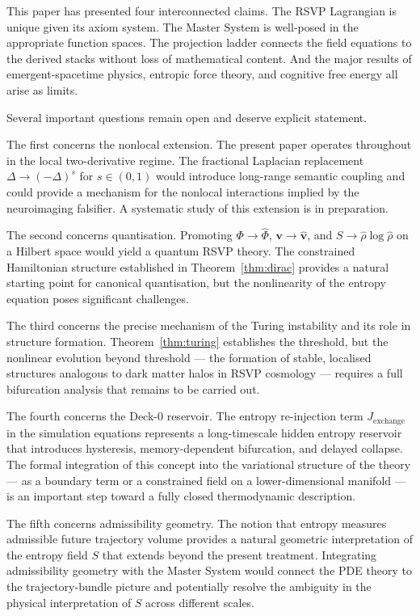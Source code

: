 \documentclass[12pt, a4paper]{article}
\theoremstyle{plain}
\theoremstyle{definition}
\theoremstyle{remark}
\newcommand{\vfield}{\mathbf{v}}
\begin{document}
This paper has presented four interconnected claims.  The RSVP Lagrangian is unique
given its axiom system.  The Master System is well-posed in the appropriate function
spaces.  The projection ladder connects the field equations to the derived stacks without
loss of mathematical content.  And the major results of emergent-spacetime physics,
entropic force theory, and cognitive free energy all arise as limits.

Several important questions remain open and deserve explicit statement.

The first concerns the nonlocal extension.  The present paper operates throughout in the
local two-derivative regime.  The fractional Laplacian replacement $\Delta \to (-\Delta)^s$
for $s \in (0,1)$ would introduce long-range semantic coupling and could provide a
mechanism for the nonlocal interactions implied by the neuroimaging falsifier.  A
systematic study of this extension is in preparation.

The second concerns quantisation.  Promoting $\Phi \to \hat{\Phi}$, $\vfield \to \hat{\vfield}$,
and $S \to \hat{\rho}\log\hat{\rho}$ on a Hilbert space would yield a quantum RSVP theory.
The constrained Hamiltonian structure established in Theorem~\ref{thm:dirac} provides a
natural starting point for canonical quantisation, but the nonlinearity of the entropy
equation poses significant challenges.

The third concerns the precise mechanism of the Turing instability and its role in structure
formation.  Theorem~\ref{thm:turing} establishes the threshold, but the nonlinear evolution
beyond threshold --- the formation of stable, localised structures analogous to dark matter
halos in RSVP cosmology --- requires a full bifurcation analysis that remains to be carried out.

The fourth concerns the Deck-0 reservoir.  The entropy re-injection term $J_{\mathrm{exchange}}$
in the simulation equations represents a long-timescale hidden entropy reservoir that
introduces hysteresis, memory-dependent bifurcation, and delayed collapse.  The formal
integration of this concept into the variational structure of the theory --- as a boundary
term or a constrained field on a lower-dimensional manifold --- is an important step toward
a fully closed thermodynamic description.

The fifth concerns admissibility geometry. The notion that entropy measures admissible future trajectory volume provides a natural geometric interpretation of the entropy field $S$ that extends beyond the present treatment. Integrating admissibility geometry with the Master System would connect the PDE theory to the trajectory-bundle picture and potentially resolve the ambiguity in the physical interpretation of $S$ across different scales.
\end{document}
